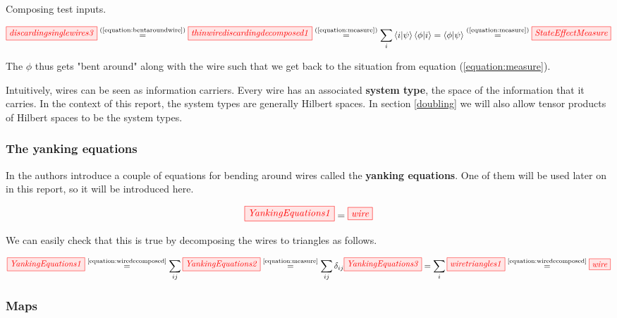 \documentclass[]{article}
\newcommand{\equaltext}[1]{\ensuremath{\stackrel{\text{#1}}{=}}}
\begin{document}
Composing test inputs.

\begin{equation}
\label{equation:bentaroundwiresinandoutputs}
\tikzfig{discardingsinglewires3} \equaltext{(\ref{equation:bentaroundwire})} \tikzfig{thinwirediscardingdecomposed1} \equaltext{(\ref{equation:measure})} \sum_{i}\bra{i}\ket{\psi}\bra{\phi}\ket{i} = \bra{\phi}\ket{\psi} \equaltext{(\ref{equation:measure})} \tikzfig{StateEffectMeasure}
\end{equation}

The $\phi$ thus gets "bent around" along with the wire such that we get back to the situation from equation (\ref{equation:measure}). 

Intuitively, wires can be seen as information carriers. Every wire has an associated \textbf{system type}, the space of the information that it carries. In the context of this report, the system types are generally Hilbert spaces. In section \ref{doubling} we will also allow tensor products of Hilbert spaces to be the system types.

\subsubsection{The yanking equations}
\label{section:yankingequations}

In \cite{Coecke2017} the authors introduce a couple of equations for bending around wires called the \textbf{yanking equations}. One of them will be used later on in this report, so it will be introduced here.

\begin{equation}
\label{equation:yankingequation}
\tikzfig{YankingEquations1} = \tikzfig{wire}
\end{equation}

We can easily check that this is true by decomposing the wires to triangles as follows.

\begin{equation}
\tikzfig{YankingEquations1} \equaltext{\ref{equation:wiredecomposed}} \sum\limits_{ij} \tikzfig{YankingEquations2} \equaltext{\ref{equation:measure}} \sum\limits_{ij} \delta_{ij} \tikzfig{YankingEquations3} = \sum\limits_{i} \tikzfig{wiretriangles1} \equaltext{\ref{equation:wiredecomposed}} \tikzfig{wire}
\end{equation}

\subsubsection{Maps}
\label{maps}
\end{document}
